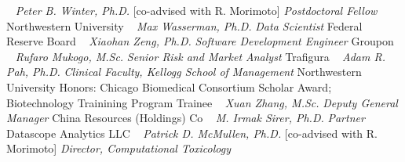     \newline
~
\Gap{}
\textit{Peter B. Winter, Ph.D.}
    [co-advised with R. Morimoto]
\newline
    \textit{Postdoctoral Fellow}
    \newline
    Northwestern University
    \newline
~
\Gap{}
\textit{Max Wasserman, Ph.D.}
\newline
    \textit{Data Scientist}
    \newline
    Federal Reserve Board
    \newline
~
\Gap{}
\textit{Xiaohan Zeng, Ph.D.}
\newline
    \textit{Software Development Engineer}
    \newline
    Groupon
    \newline
~
\Gap{}
\textit{Rufaro Mukogo, M.Sc.}
\newline
    \textit{Senior Risk and Market Analyst}
    \newline
    Trafigura
    \newline
~
\Gap{}
\textit{Adam R. Pah, Ph.D.}
\newline
    \textit{Clinical Faculty, Kellogg School of Management}
    \newline
    Northwestern University
    \newline
    {\footnotesize Honors: Chicago Biomedical Consortium Scholar Award; Biotechnology Trainining Program Trainee}
    \newline
~
\Gap{}
\textit{Xuan Zhang, M.Sc.}
\newline
    \textit{Deputy General Manager}
    \newline
    China Resources (Holdings) Co
    \newline
~
\Gap{}
\textit{M. Irmak Sirer, Ph.D.}
\newline
    \textit{Partner}
    \newline
    Datascope Analytics LLC
    \newline
~
\Gap{}
\textit{Patrick D. McMullen, Ph.D.}
    [co-advised with R. Morimoto]
\newline
    \textit{Director, Computational Toxicology}
    \newline
